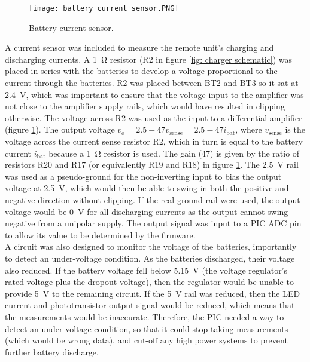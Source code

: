  

\begin{figure}[htbp]
	\centering
	\texttt{[image: battery current sensor.PNG]}
	\caption{Battery current sensor.}
	\label{fig: battery current sensor}
\end{figure}

A current sensor was included to measure the remote unit's charging and discharging currents. A \SI{1}{\ohm} resistor (R2 in figure \ref{fig: charger schematic}) was placed in series with the batteries to develop a voltage proportional to the current through the batteries. R2 was placed between BT2 and BT3 so it sat at \SI{2.4}{\volt}, which was important to ensure that the voltage input to the amplifier was not close to the amplifier supply rails, which would have resulted in clipping otherwise. The voltage across R2 was used as the input to a differential amplifier (figure \ref{fig: battery current sensor}). The output voltage $v_o = 2.5 - 47v_\text{sense} = 2.5 - 47 i_\text{bat}$, where $v_\text{sense}$ is the voltage across the current sense resistor R2, which in turn is equal to the battery current $i_\text{bat}$ because a \SI{1}{\ohm} resistor is used. The gain (47) is given by the ratio of resistors R20 and R17 (or equivalently R19 and R18) in figure \ref{fig: battery current sensor}. The \SI{2.5}{\volt} rail was used as a pseudo-ground for the non-inverting input to bias the output voltage at \SI{2.5}{\volt}, which would then be able to swing in both the positive and negative direction without clipping. If the real ground rail were used, the output voltage would be \SI{0}{\volt} for all discharging currents as the output cannot swing negative from a unipolar supply. The output signal was input to a PIC ADC pin to allow its value to be determined by the firmware.\\



A circuit was also designed to monitor the voltage of the batteries, importantly to detect an under-voltage condition. As the batteries discharged, their voltage also reduced. If the battery voltage fell below \SI{5.15}{\volt} (the voltage regulator's rated voltage plus the dropout voltage), then the regulator would be unable to provide \SI{5}{\volt} to the remaining circuit. If the \SI{5}{\volt} rail was reduced, then the LED current and phototransistor output signal would be reduced, which means that the measurements would be inaccurate. Therefore, the PIC needed a way to detect an under-voltage condition, so that it could stop taking measurements (which would be wrong data), and cut-off any high power systems to prevent further battery discharge.\\

